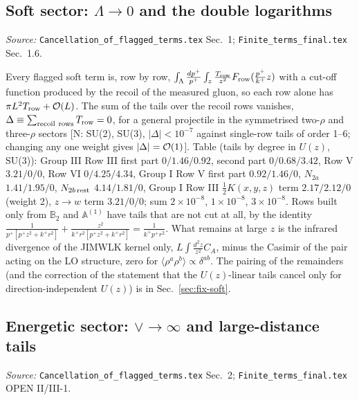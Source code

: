 \documentclass[10pt]{article}
\def\mf#1{\mathbb{#1}}
\begin{document}
\subsection{Soft sector: $\Lambda\to0$ and the double logarithms}\label{sec:calc-soft}
\noindent\emph{Source:} \texttt{Cancellation\_of\_flagged\_terms.tex} Sec.~1; \texttt{Finite\_terms\_final.tex} Sec.~1.6.

\noindent Every flagged soft term is, row by row, $\int_{\Lambda}\frac{dp^{+}}{p^{+}}\int_{z}\frac{T_{\rm row}}{z^{2}}F_{\rm row}(\frac{p^{+}}{k^{+}}z)$ with a cut-off function produced by the recoil of the measured gluon, so each row alone has $\pi L^{2}T_{\rm row}+{\cal O}(L)$. The sum of the tails over the recoil rows vanishes, $\Delta\equiv\sum_{\rm recoil\ rows}T_{\rm row}=0$, for a general projectile in the symmetrised two-$\rho$ and three-$\rho$ sectors [N: SU(2), SU(3), $|\Delta|<10^{-7}$ against single-row tails of order 1--6; changing any one weight gives $|\Delta|={\cal O}(1)$]. Table (tails by degree in $U(z)$, SU(3)): Group III Row III first part $0/1.46/0.92$, second part $0/0.68/3.42$, Row V $3.21/0/0$, Row VI $0/4.25/4.34$, Group I Row V first part $0.92/1.46/0$, $N_{2a}$ $1.41/1.95/0$, $N_{2b\,\rm rest}$ $4.14/1.81/0$, Group I Row III $\frac12K(x,y,z)$ term $2.17/2.12/0$ (weight 2), $z\to w$ term $3.21/0/0$; sum $2\times10^{-8}$, $1\times10^{-8}$, $3\times10^{-8}$. Rows built only from $\mf{B}_{2}$ and $\mf{A}^{(1)}$ have tails that are not cut at all, by the identity $\frac{1}{p^{+}[p^{+}z^{2}+k^{+}r^{2}]}+\frac{z^{2}}{k^{+}r^{2}[p^{+}z^{2}+k^{+}r^{2}]}=\frac{1}{k^{+}p^{+}r^{2}}$. What remains at large $z$ is the infrared divergence of the JIMWLK kernel only, $L\int\frac{d^{2}z}{z^{2}}C_{A}$, minus the Casimir of the pair acting on the LO structure, zero for $\langle\rho^{a}\rho^{b}\rangle\propto\delta^{ab}$. The pairing of the remainders (and the correction of the statement that the $U(z)$-linear tails cancel only for direction-independent $U(z)$) is in Sec.~\ref{sec:fix-soft}.

\subsection{Energetic sector: $\vee\to\infty$ and large-distance tails}\label{sec:calc-energetic}
\noindent\emph{Source:} \texttt{Cancellation\_of\_flagged\_terms.tex} Sec.~2; \texttt{Finite\_terms\_final.tex} OPEN II/III-1.
\end{document}
